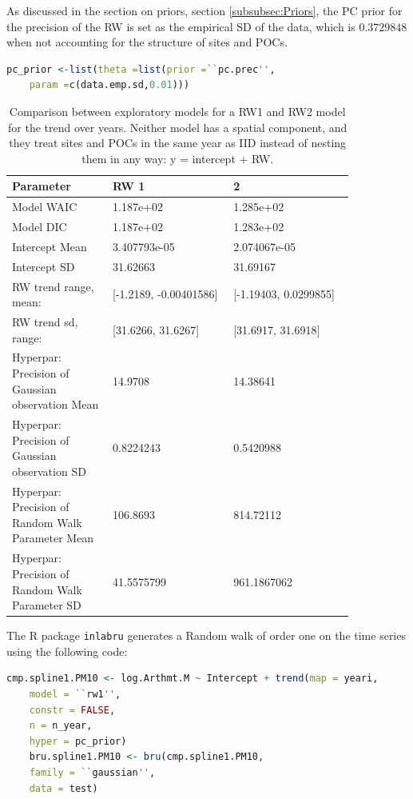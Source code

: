 \documentclass{article}
\begin{document}
As discussed in the section on priors, section \ref{subsubsec:Priors}, the \ac{PC} prior for the precision of the RW is set as the empirical SD of the data, which is $0.3729848$ when not accounting for the structure of sites and \ac{POC}s.
\begin{lstlisting}[language=R]
	pc_prior <-list(theta =list(prior =``pc.prec'',
	param =c(data.emp.sd,0.01)))
\end{lstlisting}

\begin{table}[ht]
	\centering
	\begin{tabular}{p{0.25\linewidth}|p{0.30\linewidth}|p{0.30\linewidth}}
		Parameter & RW 1 &  2 \\ \hline
		Model WAIC & 1.187e+02 & 1.285e+02\\
		Model DIC & 1.187e+02 & 1.283e+02 \\
		\hline
		Intercept Mean & 3.407793e-05 & 2.074067e-05 \\
		Intercept SD & 31.62663 & 31.69167 \\
		\hline
		RW trend range, mean: & [-1.2189, -0.00401586] & [-1.19403, 0.0299855] \\
		RW trend sd, range: & [31.6266, 31.6267] & [31.6917, 31.6918] \\
		\hline
		Hyperpar: Precision of Gaussian observation Mean & 14.9708 & 14.38641 \\
		Hyperpar: Precision of Gaussian observation SD & 0.8224243 & 0.5420988 \\
		Hyperpar: Precision of Random Walk Parameter Mean & 106.8693 & 814.72112 \\
		Hyperpar: Precision of Random Walk Parameter SD & 41.5575799 & 961.1867062 \\
		
	\end{tabular}
	\caption{Comparison between exploratory models for a \ac{RW}1 and \ac{RW}2 model for the trend over years.  Neither model has a spatial component, and they treat sites and \ac{POC}s in the same year as \ac{IID} instead of nesting them in any way: y = intercept + RW. }
	\label{tab:RW_parameters}
\end{table}

The R package \lstinline{inlabru} generates a Random walk of order one on the time series using the following code:
\begin{lstlisting}[language = R]
	cmp.spline1.PM10 <- log.Arthmt.M ~ Intercept + trend(map = yeari,
	model = ``rw1'',
	constr = FALSE,
	n = n_year,
	hyper = pc_prior)
	bru.spline1.PM10 <- bru(cmp.spline1.PM10,
	family = ``gaussian'',
	data = test)
	
\end{lstlisting}
\end{document}
